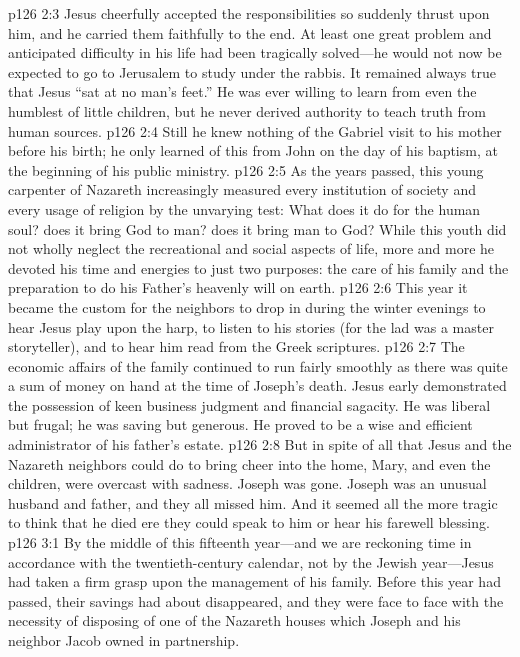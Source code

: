 \vs p126 2:3 Jesus cheerfully accepted the responsibilities so suddenly thrust upon him, and he carried them faithfully to the end. At least one great problem and anticipated difficulty in his life had been tragically solved---he would not now be expected to go to Jerusalem to study under the rabbis. It remained always true that Jesus “sat at no man’s feet.” He was ever willing to learn from even the humblest of little children, but he never derived authority to teach truth from human sources.
\vs p126 2:4 Still he knew nothing of the Gabriel visit to his mother before his birth; he only learned of this from John on the day of his baptism, at the beginning of his public ministry.
\pc \vs p126 2:5 As the years passed, this young carpenter of Nazareth increasingly measured every institution of society and every usage of religion by the unvarying test: What does it do for the human soul? does it bring God to man? does it bring man to God? While this youth did not wholly neglect the recreational and social aspects of life, more and more he devoted his time and energies to just two purposes: the care of his family and the preparation to do his Father’s heavenly will on earth.
\pc \vs p126 2:6 This year it became the custom for the neighbors to drop in during the winter evenings to hear Jesus play upon the harp, to listen to his stories (for the lad was a master storyteller), and to hear him read from the Greek scriptures.
\vs p126 2:7 The economic affairs of the family continued to run fairly smoothly as there was quite a sum of money on hand at the time of Joseph’s death. Jesus early demonstrated the possession of keen business judgment and financial sagacity. He was liberal but frugal; he was saving but generous. He proved to be a wise and efficient administrator of his father’s estate.
\vs p126 2:8 But in spite of all that Jesus and the Nazareth neighbors could do to bring cheer into the home, Mary, and even the children, were overcast with sadness. Joseph was gone. Joseph was an unusual husband and father, and they all missed him. And it seemed all the more tragic to think that he died ere they could speak to him or hear his farewell blessing.
\vs p126 3:1 By the middle of this fifteenth year---and we are reckoning time in accordance with the twentieth\hyp{}century calendar, not by the Jewish year---Jesus had taken a firm grasp upon the management of his family. Before this year had passed, their savings had about disappeared, and they were face to face with the necessity of disposing of one of the Nazareth houses which Joseph and his neighbor Jacob owned in partnership.
